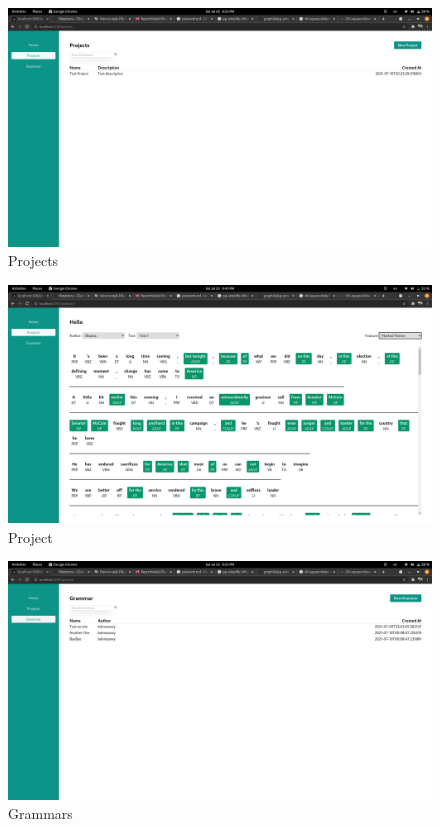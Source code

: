 \begin{figure}[H]
    \includegraphics[width=15cm]{images/Projects.png}
    \caption{Projects}
\end{figure}
\begin{figure}[H]
    \includegraphics[width=15cm]{images/Project.png}
    \caption{Project}
\end{figure}

\begin{figure}[H]
    \includegraphics[width=15cm]{images/Grammars.png}
    \caption{Grammars}
\end{figure}

